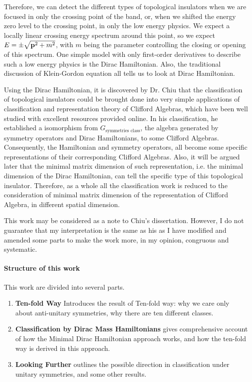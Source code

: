 \documentclass{article}
\begin{document}
Therefore, we can detect the different types of topological insulators when we
are focused in only the crossing point of the band, or, when we shifted the
energy zero level to the crossing point, in only the low energy physics. We
expect a locally linear crossing energy spectrum around this point, so we expect
$E=\pm\sqrt{\vb{p}^2+m^2}$, with $m$ being the parameter controlling the closing or
opening of this spectrum. One simple model with only first-order derivatives to
describe such a low energy physics is the Dirac Hamiltonian. Also, the
traditional discussion of Klein-Gordon equation all tells us to look at Dirac
Hamiltonian.

Using the Dirac Hamiltonian, it is discovered by Dr. Chiu \cite{Chiu2013a} that
the classification of topological insulators could be brought done into very
simple applications of classification and representation theory of Clifford
Algebras, which have been well studied with excellent resources provided online.
In his classification, he established a isomorphism from $G_{\text{symmetries 
class}}$, the algebra generated by symmetry operators and Dirac Hamiltonians, to
some Clifford Algebras. Consequently, the Hamiltonian and symmetry operators,
all become some specific representations of their corresponding Clifford
Algebras. Also, it will be argued later that the minimal matrix dimension of
such representation, i.e. the minimal dimension of the Dirac Hamiltonian, can
tell the specific type of this topological insulator. Therefore, as a whole all
the classification work is reduced to the consideration of minimal matrix
dimension of the representation of Clifford Algebra, in different spatial
dimension.

This work may be considered as a note to Chiu's dissertation\cite{Chiu2013a}.
However, I do not guarantee that my interpretation is the same as his as I have
modified and amended some parts to make the work more, in my opinion, congruous
and systematic.

\paragraph{Structure of this work} This work are divided into several parts.
\begin{enumerate}
    \item \textbf{Ten-fold Way} Introduces the result of Ten-fold way: why we
        care only about anti-unitary symmetries, why there are ten different
        classes.
    \item \textbf{Classification by Dirac Mass Hamiltonians} gives comprehensive
        account of how the Minimal Dirac Hamiltonian approach works, and how the
        ten-fold way is derived in this approach.
    \item \textbf{Looking Further} outlines the possible direction in classification
        under unitary symmetries, and some other results.
\end{enumerate}
\end{document}

